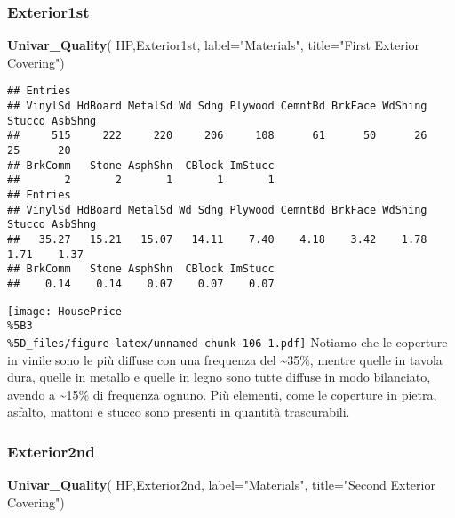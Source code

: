 \documentclass[
]{article}
\newenvironment{Shaded}{\begin{snugshade}}{\end{snugshade}}
\newcommand{\AttributeTok}[1]{\textcolor[rgb]{0.13,0.29,0.53}{#1}}
\newcommand{\FunctionTok}[1]{\textcolor[rgb]{0.13,0.29,0.53}{\textbf{#1}}}
\newcommand{\NormalTok}[1]{#1}
\newcommand{\StringTok}[1]{\textcolor[rgb]{0.31,0.60,0.02}{#1}}
\begin{document}
\subsubsection{Exterior1st}\label{exterior1st}

\begin{Shaded}
\begin{Highlighting}[]
\FunctionTok{Univar\_Quality}\NormalTok{(}
\NormalTok{  HP,Exterior1st,}
  \AttributeTok{label=}\StringTok{"Materials"}\NormalTok{,}
  \AttributeTok{title=}\StringTok{"First Exterior Covering"}\NormalTok{)}
\end{Highlighting}
\end{Shaded}

\begin{verbatim}
## Entries
## VinylSd HdBoard MetalSd Wd Sdng Plywood CemntBd BrkFace WdShing  Stucco AsbShng 
##     515     222     220     206     108      61      50      26      25      20 
## BrkComm   Stone AsphShn  CBlock ImStucc 
##       2       2       1       1       1 
## Entries
## VinylSd HdBoard MetalSd Wd Sdng Plywood CemntBd BrkFace WdShing  Stucco AsbShng 
##   35.27   15.21   15.07   14.11    7.40    4.18    3.42    1.78    1.71    1.37 
## BrkComm   Stone AsphShn  CBlock ImStucc 
##    0.14    0.14    0.07    0.07    0.07
\end{verbatim}

\texttt{[image: HousePrice\\\%5B3\\\%5D\_files/figure-latex/unnamed-chunk-106-1.pdf]}
Notiamo che le coperture in vinile sono le più diffuse con una frequenza
del \textasciitilde35\%, mentre quelle in tavola dura, quelle in metallo
e quelle in legno sono tutte diffuse in modo bilanciato, avendo a
\textasciitilde15\% di frequenza ognuno. Più elementi, come le coperture
in pietra, asfalto, mattoni e stucco sono presenti in quantità
trascurabili.

\subsubsection{Exterior2nd}\label{exterior2nd}

\begin{Shaded}
\begin{Highlighting}[]
\FunctionTok{Univar\_Quality}\NormalTok{(}
\NormalTok{  HP,Exterior2nd,}
  \AttributeTok{label=}\StringTok{"Materials"}\NormalTok{,}
  \AttributeTok{title=}\StringTok{"Second Exterior Covering"}\NormalTok{)}
\end{Highlighting}
\end{Shaded}
\end{document}

